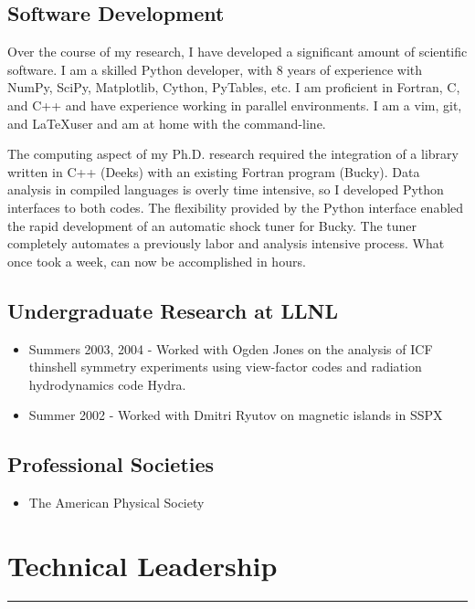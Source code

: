 \documentclass[letterpaper,11pt]{article}
\begin{document}
\subsection*{Software Development}
Over the course of my research, I have developed a significant amount of
scientific software.  I am a skilled Python developer, with 8 years of
experience with NumPy, SciPy, Matplotlib, Cython, PyTables, etc.  I am
proficient in Fortran, C, and C++ and have experience working in parallel
environments.  I am a vim, git, and \LaTeX user and am at home with the
command-line.

The computing aspect of my Ph.D. research required the integration of a library
written in C++ (Deeks) with an existing Fortran program (Bucky).  Data analysis
in compiled languages is overly time intensive, so I developed Python
interfaces to both codes.  The flexibility provided by the Python interface
enabled the rapid development of an automatic shock tuner for Bucky.  The tuner
completely automates a previously labor and analysis intensive process.  What
once took a week, can now be accomplished in hours.

\subsection*{Undergraduate Research at LLNL}
\begin{itemize}
	\item Summers 2003, 2004 - Worked with Ogden Jones on the analysis of ICF thinshell symmetry experiments using view-factor codes and radiation hydrodynamics code Hydra.
	\item Summer 2002 -  Worked with Dmitri Ryutov on magnetic islands in SSPX
\end{itemize}

\subsection*{Professional Societies}
\begin{itemize}
	\item The American Physical Society
\end{itemize}

\pagebreak

\section*{Technical Leadership}
\hrule
\vspace{0.05in}
\end{document}
